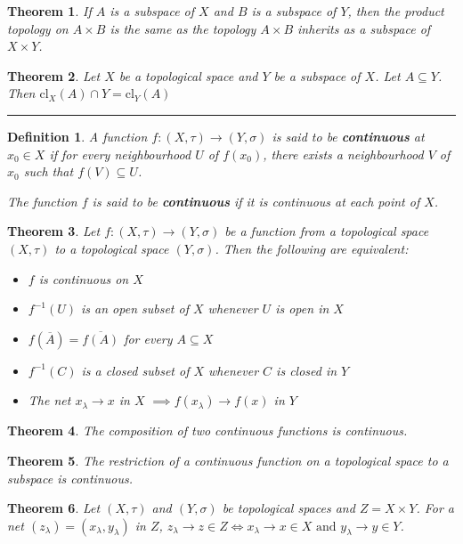 \documentclass[14pt,twoside]{extreport}
\newcommand{\hhrule}{\vspace{1cm}\hrule\vspace{1cm}}
\theoremstyle{dotless}
\newtheorem*{defn}{Definition}
\newtheorem*{thm}{Theorem} %
\begin{document}
\begin{thm}
    If $A$ is a subspace of $X$ and $B$ is a subspace of $Y$, then the product topology on $A \times B$ is the same as the topology $A \times B$ inherits as a subspace of $X \times Y$.
\end{thm}

\begin{thm}
    Let $X$ be a topological space and $Y$ be a subspace of $X$. Let $A \subseteq Y$. Then $\text{cl}_X(A) \cap Y = \text{cl}_Y(A)$
\end{thm}

\hhrule

\begin{defn}
    A function $f:(X, \tau) \to (Y, \sigma)$ is said to be \textbf{continuous} at $x_0 \in X$ if for every neighbourhood $U$ of $f(x_0)$, there exists a neighbourhood $V$ of $x_0$ such that $f(V) \subseteq U$.

    The function $f$ is said to be \textbf{continuous} if it is continuous at each point of $X$.
\end{defn}

\begin{thm}
    Let $f:(X,\tau) \to (Y, \sigma)$ be a function from a topological space $(X,\tau)$ to a topological space $(Y,\sigma)$. Then the following are equivalent:
    \begin{itemize}
        \item $f$ is continuous on $X$
        \item $f^{-1}(U)$ is an open subset of $X$ whenever $U$ is open in $X$
        \item $f(\overline{A}) = \overline{f(A)}$ for every $A \subseteq X$
        \item $f^{-1}(C)$ is a closed subset of $X$ whenever $C$ is closed in $Y$
        \item The net $x_\lambda \to x$ in $X$ $\implies f(x_\lambda) \to f(x)$ in $Y$
    \end{itemize}
\end{thm}

\begin{thm}
    The composition of two continuous functions is continuous.
\end{thm}

\begin{thm}
    The restriction of a continuous function on a topological space to a subspace is continuous.
\end{thm}

\begin{thm}
    Let $(X, \tau)$ and $(Y, \sigma)$ be topological spaces and $Z = X \times Y$. 
    For a net $(z_\lambda) = (x_\lambda, y_\lambda)$ in $Z$, $z_\lambda \to z \in Z \iff x_\lambda \to x \in X \text{ and } y_\lambda \to y \in Y$.
\end{thm}
\end{document}
